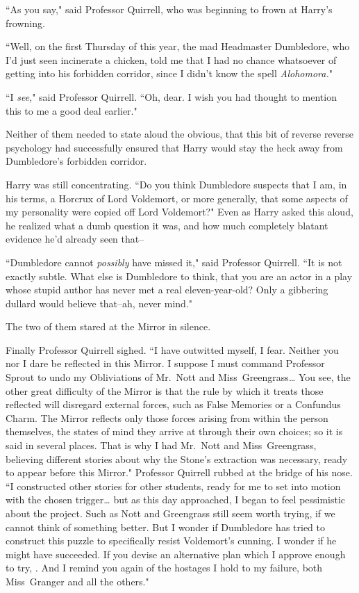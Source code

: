 ``As you say," said Professor Quirrell, who was beginning to frown at Harry's frowning.

``Well, on the first Thursday of this year, the mad Headmaster Dumbledore, who I'd just seen incinerate a chicken, told me that I had no chance whatsoever of getting into his forbidden corridor, since I didn't know the spell \emph{Alohomora.}"

``I \emph{see}," said Professor Quirrell. ``Oh, dear. I wish you had thought to mention this to me a good deal earlier."

Neither of them needed to state aloud the obvious, that this bit of reverse reverse psychology had successfully ensured that Harry would stay the heck away from Dumbledore's forbidden corridor.

Harry was still concentrating. ``Do you think Dumbledore suspects that I am, in his terms, a Horcrux of Lord Voldemort, or more generally, that some aspects of my personality were copied off Lord Voldemort?" Even as Harry asked this aloud, he realized what a dumb question it was, and how much completely blatant evidence he'd already seen that\---

``Dumbledore cannot \emph{possibly} have missed it," said Professor Quirrell. ``It is not exactly subtle. What else is Dumbledore to think, that you are an actor in a play whose stupid author has never met a real eleven-year-old? Only a gibbering dullard would believe that\---ah, never mind."

The two of them stared at the Mirror in silence.

Finally Professor Quirrell sighed. ``I have outwitted myself, I fear. Neither you nor I dare be reflected in this Mirror. I suppose I must command Professor Sprout to undo my Obliviations of Mr.~Nott and Miss~Greengrass{\ldots} You see, the other great difficulty of the Mirror is that the rule by which it treats those reflected will disregard external forces, such as False Memories or a Confundus Charm. The Mirror reflects only those forces arising from within the person themselves, the states of mind they arrive at through their own choices; so it is said in several places. That is why I had Mr.~Nott and Miss~Greengrass, believing different stories about why the Stone's extraction was necessary, ready to appear before this Mirror." Professor Quirrell rubbed at the bridge of his nose. ``I constructed other stories for other students, ready for me to set into motion with the chosen trigger{\ldots} but as this day approached, I began to feel pessimistic about the project. Such as Nott and Greengrass still seem worth trying, if we cannot think of something better. But I wonder if Dumbledore has tried to construct this puzzle to specifically resist Voldemort's cunning. I wonder if he might have succeeded. If you devise an alternative plan which I approve enough to try, . And I remind you again of the hostages I hold to my failure, both Miss~Granger and all the others."


